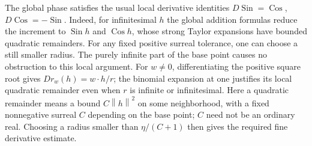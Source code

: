 \documentclass[11pt,letterpaper]{article}
\numberwithin{equation}{section}
\theoremstyle{definition}
\theoremstyle{remark}
\newcommand{\Sin}{\operatorname{Sin}}
\newcommand{\Cos}{\operatorname{Cos}}
\newcommand{\norm}[1]{\left\lVert#1\right\rVert}
\begin{document}
The global phase satisfies the usual local derivative identities
\(D\Sin=\Cos\), \(D\Cos=-\Sin\). Indeed, for infinitesimal \(h\) the global
addition formulas reduce the increment to \(\Sin h\) and \(\Cos h\), whose
strong Taylor expansions have bounded quadratic remainders. For any fixed
positive surreal tolerance, one can choose a still smaller radius. The purely
infinite part of the base point causes no obstruction to this local argument.
For \(w\ne0\), differentiating the positive square root gives
\(Dr_w(h)=w\cdot h/r\); the binomial expansion at one justifies its local
quadratic remainder even when \(r\) is infinite or infinitesimal.
Here a quadratic remainder means a bound \(C\norm h^2\) on some neighborhood,
with a fixed nonnegative surreal \(C\) depending on the base point; \(C\) need
not be an ordinary real. Choosing a radius smaller than \(\eta/(C+1)\) then
gives the required fine derivative estimate.
\end{document}
